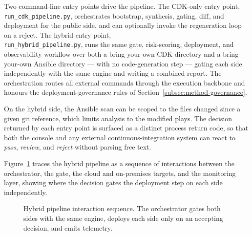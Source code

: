 Two command-line entry points drive the pipeline. The CDK-only entry point,
\texttt{run\_cdk\_pipeline.py}, orchestrates bootstrap, synthesis, gating, diff, and
deployment for the public side, and can optionally invoke the regeneration loop on a
reject. The hybrid entry point,\\ \texttt{run\_hybrid\_pipeline.py}, runs the same
gate, risk-scoring, deployment, and observability workflow over both a bring-your-own CDK
directory and a bring-your-own Ansible directory --- with no code-generation step ---
gating each side independently with the same engine and writing a combined report. The
orchestration routes all external commands through the execution backbone and honours the
deployment-governance rules of Section~\ref{subsec:method-governance}.

On the hybrid side, the Ansible scan can be scoped to the files changed since a given git
reference, which limits analysis to the modified plays. The decision returned by each
entry point is surfaced as a distinct process return code, so that both the console and
any external continuous-integration system can react to \emph{pass}, \emph{review}, and
\emph{reject} without parsing free text.

Figure~\ref{fig:impl-sequence} traces the hybrid pipeline as a sequence of interactions
between the orchestrator, the gate, the cloud and on-premises targets, and the monitoring
layer, showing where the decision gates the deployment step on each side independently.

\begin{figure}[ht]
\centering
{}
\caption{Hybrid pipeline interaction sequence. The orchestrator gates both sides with the
same engine, deploys each side only on an accepting decision, and emits telemetry.}
\label{fig:impl-sequence}
\end{figure}

